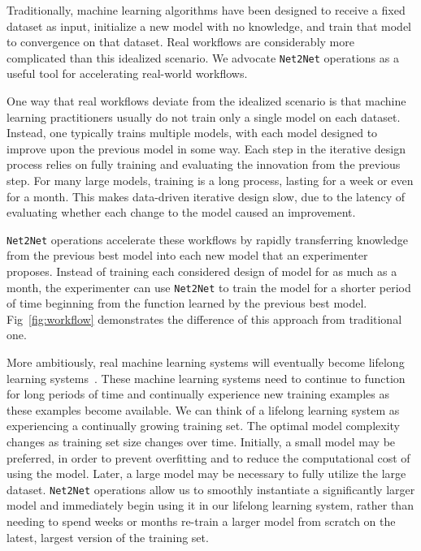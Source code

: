 \documentclass{article} %
\begin{document}
Traditionally, machine learning algorithms have been designed to receive
a fixed dataset as input, initialize a new model with no knowledge, and
train that model to convergence on that dataset.
Real workflows are considerably more complicated than this idealized
scenario. We advocate {\tt Net2Net} operations as a useful tool for
accelerating real-world workflows.

One way that real workflows deviate from the idealized scenario is that
machine learning practitioners usually do not train only a single
model on each dataset. Instead, one typically trains multiple models, with
each model designed to improve upon the previous model in some way. Each
step in the iterative design process relies on fully training and evaluating
the innovation from the previous step. For many large models, training is
a long process, lasting for a week or even for a month. This makes
data-driven iterative design slow, due to the latency of evaluating whether
each change to the model caused an improvement.

{\tt Net2Net} operations accelerate these workflows by rapidly transferring
knowledge from the previous best model into each new model that an
experimenter proposes. Instead of training each considered design of model
for as much as a month, the experimenter can use {\tt Net2Net} to train the model
for a shorter period of time beginning from the function learned by the
previous best model. Fig~\ref{fig:workflow} demonstrates the difference of this approach
from traditional one.

More ambitiously, real machine learning systems will eventually become
lifelong learning systems~\citep{thrun95a,silver2013lifelong,NELL-aaai15}.
These machine learning systems need to continue to function for long periods
of time and continually experience new training examples as these examples
become available. We can think of a lifelong learning system as experiencing
a continually growing training set. The optimal model complexity changes
as training set size changes over time.
Initially, a small model may be preferred, in order to prevent overfitting and to reduce
the computational cost of using the model. Later, a large model may be
necessary to fully utilize the large dataset.
{\tt Net2Net} operations allow us to smoothly instantiate a significantly larger
model and immediately begin using it in our lifelong learning system, rather
than needing to spend weeks or months re-train a larger model from scratch on the latest,
largest version of the training set.
\end{document}
